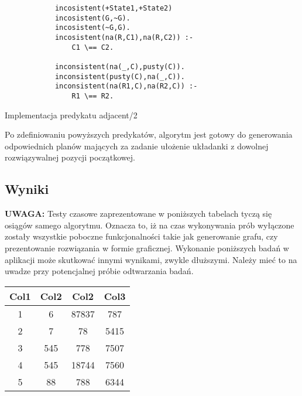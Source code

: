     \begin{listing}[H]
        \begin{verbatim}
            incosistent(+State1,+State2)
            incosistent(G,~G).
            incosistent(~G,G).
            incosistent(na(R,C1),na(R,C2)) :-
                C1 \== C2.
            
            inconsistent(na(_,C),pusty(C)).
            inconsistent(pusty(C),na(_,C)).
            inconsistent(na(R1,C),na(R2,C)) :-
                R1 \== R2.
        \end{verbatim}
    \caption{Implementacja predykatu adjacent/2}
    \end{listing}

    Po zdefiniowaniu powyższych predykatów, algorytm jest gotowy do generowania odpowiednich planów mających za zadanie ułożenie 
    układanki z dowolnej rozwiązywalnej pozycji początkowej.
    \subsection{Wyniki}

    \textbf{UWAGA:} Testy czasowe zaprezentowane w poniższych tabelach tyczą się osiągów samego algorytmu. Oznacza to, iż na czas wykonywania prób
    wyłączone zostały wszystkie poboczne funkcjonalności takie jak generowanie grafu, czy prezentowanie rozwiązania w formie graficznej. 
    Wykonanie poniższych badań w aplikacji może skutkować innymi wynikami, zwykle dłuższymi. Należy mieć to na uwadze przy potencjalnej 
    próbie odtwarzania badań.

    \begin{table}[H]
        \centering
         \begin{tabular}{||c c c c||} 
         \hline
         Col1 & Col2 & Col2 & Col3 \\ [0.5ex] 
         \hline\hline
         1 & 6 & 87837 & 787 \\ 
         \hline
         2 & 7 & 78 & 5415 \\
         \hline
         3 & 545 & 778 & 7507 \\
         \hline
         4 & 545 & 18744 & 7560 \\
         \hline
         5 & 88 & 788 & 6344 \\ [1ex] 
         \hline
         \end{tabular}
    \end{table}

    



